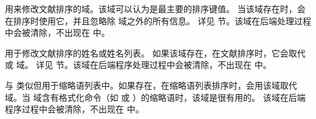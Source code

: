 \begin{fieldlist}

用来修改文献排序的域。该域可以认为是最主要的排序键值。
当该域存在时，\biblatex 会在排序时使用它，并且忽略除  域之外的所有信息。
详见  节。该域在后端处理过程中会被清除，不出现在  中。




用于修改文献排序的姓名或姓名列表。
如果该域存在，在文献排序时，它会取代   或  域。
详见  节。该域在后端程序处理过程中会被清除，不出现在  中。




与  类似但用于缩略语列表中。如果存在，在缩略语列表排序时，\biblatex 会用该域取代  域。当  域含有格式化命令（如  或 ）的缩略语时，该域是很有用的。
该域在后端程序过程中会被清除，不出现在  中。




\end{fieldlist}

